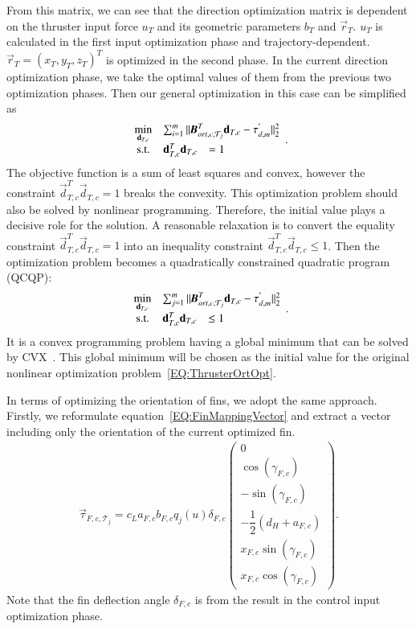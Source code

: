 From this matrix, we can see that the direction optimization matrix is dependent on the thruster input force $u_{T}$ and its geometric parameters $b_{T}$ and $\vec{r}_{T}$. $u_{T}$ is calculated in the first input optimization phase and trajectory-dependent. $\vec{r}_{T}=(x_{T},y_{T},z_{T})^{T}$ is optimized in the second phase. In the current direction optimization phase, we take the optimal values of them from the previous two optimization phases. Then our general optimization in this case can be simplified as
\begin{equation}
\begin{array}{ccclcl}
\displaystyle \min_{\vec{d}_{T,c}} & \multicolumn{3}{l}{\sum^{m}_{i=1}||\emph{\textbf{B}}_{ort,c,\mathcal{T}_{j}}^{T}\vec{d}_{T,c}-\vec{\tau}_{d,m}^{'}||^{2}_{2}} \\
\textrm{s.t.}
& \vec{d}_{T,c}^{T}\vec{d}_{T,c}&=1
\end{array}. \label{EQ:ThrusterOrtOpt}
\end{equation}
The objective function is a sum of least squares and convex, however the constraint $\vec{d}_{T,c}^{T}\vec{d}_{T,c}=1$ breaks the convexity. This optimization problem should also be solved by nonlinear programming. Therefore, the initial value plays a decisive role for the solution. A reasonable relaxation is to convert the equality constraint $\vec{d}_{T,c}^{T}\vec{d}_{T,c}=1$ into an inequality constraint $\vec{d}_{T,c}^{T}\vec{d}_{T,c}\leq 1$. Then the optimization problem becomes a quadratically constrained quadratic program (QCQP):
\begin{equation}
\begin{array}{ccclcl}
\displaystyle \min_{\vec{d}_{T,c}} & \multicolumn{3}{l}{\sum^{m}_{j=1}||\emph{\textbf{B}}_{ort,c,\mathcal{T}_{j}}^{T}\vec{d}_{T,c}-\vec{\tau}_{d,m}^{'}||^{2}_{2}} \\
\textrm{s.t.}
& \vec{d}_{T,c}^{T}\vec{d}_{T,c}&\leq1
\end{array}. \label{EQ:ThrusterOrtOptRelaxation}
\end{equation}
It is a convex programming problem having a global minimum that can be solved by CVX~\cite{cvx,gb08}. This global minimum will be chosen as the initial value for the original nonlinear optimization problem~\ref{EQ:ThrusterOrtOpt}.
 
In terms of optimizing the orientation of fins, we adopt the same approach. Firstly, we reformulate equation~\ref{EQ:FinMappingVector} and extract a vector including only the orientation of the current optimized fin.
\begin{align}
\vec{\tau}_{F,c,\mathcal{T}_{j}}=c_{L}a_{F,c}b_{F,c}q_{j}(u)\delta_{F,c}
\begin{pmatrix}
0 \\ \cos(\gamma_{F,c}) \\ -\sin(\gamma_{F,c}) \\ -\dfrac{1}{2}(d_{H}+a_{F,c}) \\ x_{F,c}\sin(\gamma_{F,c}) \\ x_{F,c}\cos(\gamma_{F,c})
\end{pmatrix}.
\end{align}
Note that the fin deflection angle $\delta_{F,c}$ is from the result in the control input optimization phase. 

